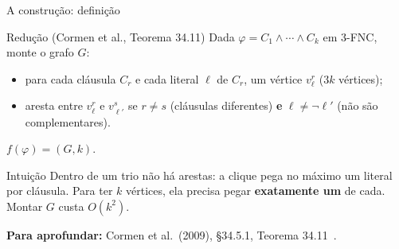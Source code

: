 \documentclass[aspectratio=169,xcolor=table]{beamer}
\newcommand{\fonte}[1]{%
  \vfill
  {\tiny\color{gray!55!black}\textbf{Para aprofundar:} #1\par}%
}
\newcommand{\nao}{\lnot}
\begin{document}
\begin{frame}{A construção: definição}
  \begin{block}{Redução (Cormen et al., Teorema 34.11)}
    \small
    Dada $\varphi = C_1 \land \cdots \land C_k$ em 3-FNC, monte o grafo $G$:
    \begin{itemize}
      \item para cada cláusula $C_r$ e cada literal $\ell$ de $C_r$, um vértice $v_\ell^r$
            ($3k$ vértices);
      \item aresta entre $v_\ell^r$ e $v_{\ell'}^s$ se $r \ne s$ (cláusulas diferentes)
            \textbf{e} $\ell \ne \nao \ell'$ (não são complementares).
    \end{itemize}
    $f(\varphi) = (G, k)$.
  \end{block}
  \begin{exampleblock}{Intuição}
    \scriptsize
    Dentro de um trio não há arestas: a clique pega no máximo um literal por cláusula. Para ter
    $k$ vértices, ela precisa pegar \textbf{exatamente um} de cada. Montar $G$ custa $O(k^2)$.
  \end{exampleblock}
  \fonte{Cormen et al.\ (2009), \S 34.5.1, Teorema 34.11~\cite{cormen2009introduction}.}
\end{frame}
\end{document}
